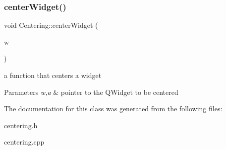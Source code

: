 \subsubsection{\texorpdfstring{center\+Widget()}{centerWidget()}}
{\footnotesize\ttfamily void Centering\+::center\+Widget (\begin{DoxyParamCaption}\item[{Q\+Widget $\ast$}]{w }\end{DoxyParamCaption})\hspace{0.3cm}{\ttfamily [static]}}



a function that centers a widget 


\begin{DoxyParams}{Parameters}
{\em w,a} & pointer to the Q\+Widget to be centered \\
\hline
\end{DoxyParams}


The documentation for this class was generated from the following files\+:\begin{DoxyCompactItemize}
\item 
centering.\+h\item 
centering.\+cpp\end{DoxyCompactItemize}
